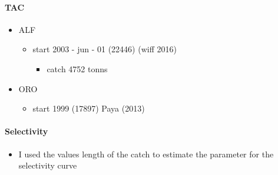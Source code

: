\documentclass[11pt]{article}
\begin{document}
\paragraph*{TAC}
\label{sec-5-2-2-2}
\begin{itemize}

\item ALF
\label{sec-5-2-2-2-1}%
\begin{itemize}
\item start 2003 - jun - 01 (22446) (wiff 2016)
\begin{itemize}
\item catch 4752 tonns
\end{itemize}
\end{itemize}

\item ORO
\label{sec-5-2-2-2-2}%
\begin{itemize}
\item start 1999 (17897) Paya (2013)
\end{itemize}
\end{itemize} %
\paragraph*{Selectivity}
\label{sec-5-2-2-3}

\begin{itemize}
\item I used the values length of the catch to estimate the parameter for the selectivity curve
\end{itemize}
\end{document}
